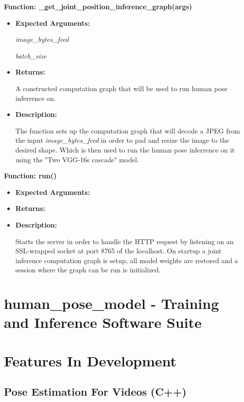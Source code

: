 \documentclass{scrreprt}
\begin{document}
\textbf{Function: \_get\_joint\_position\_inference\_graph(args)}
\begin{itemize}
    \item \textbf{Expected Arguments:}

            \quad\textit{image\_bytes\_feed}

            \quad\textit{batch\_size}

    \item \textbf{Returns:}

            A constructed computation graph that will be used to run human pose inferrence on.

    \item \textbf{Description:}

            The function sets up the computation graph that will decode a JPEG from the input \textit{image\_bytes\_feed} in order to pad and resize the image to the desired shape. Which is then used to run the human pose inferrence on it using the "Two VGG-16s cascade" model.
\end{itemize}

\textbf{Function: run()}
\begin{itemize}
    \item \textbf{Expected Arguments:}

    \item \textbf{Returns:}

    \item \textbf{Description:}

            Starts the server in order to handle the HTTP request by listening on an SSL-wrapped socket at port 8765 of the localhost. On startup a joint inference computation graph is setup, all model weights are restored and a session where the graph can be run is initialized.

\end{itemize}

\section{human\_pose\_model - Training and Inference Software Suite}

\break

\section{Features In Development}

\subsection{Pose Estimation For Videos (C++)}
\end{document}
